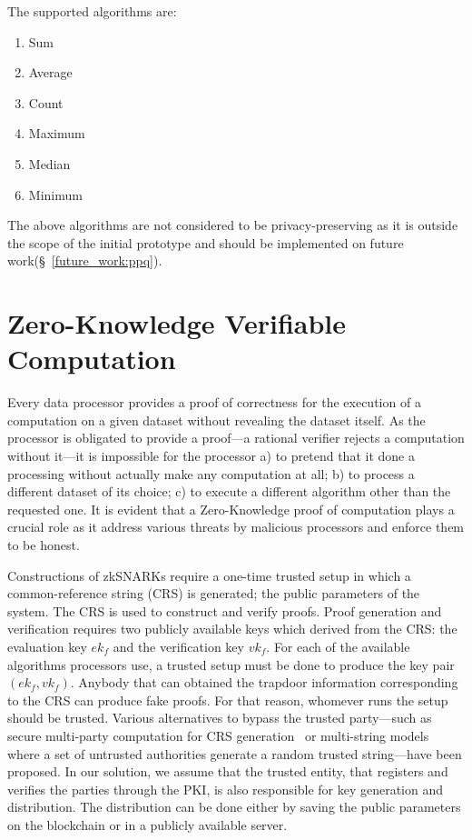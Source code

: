 The supported algorithms are:

\begin{enumerate}
  \item Sum
  \item Average
  \item Count
  \item Maximum
  \item Median
  \item Minimum
\end{enumerate}

The above algorithms are not considered to be privacy-preserving as it is outside the scope of the initial prototype and should be implemented on future work(§~\ref{future_work:ppq}).

\section{Zero-Knowledge Verifiable Computation}
\label{solution:proof}

Every data processor provides a proof of correctness for the execution of a computation on a given dataset without revealing the dataset itself. As the processor is obligated to provide a proof---a rational verifier rejects a computation without it---it is impossible for the processor a) to pretend that it done a processing without actually make any computation at all; b) to process a different dataset of its choice; c) to execute a different algorithm other than the requested one. It is evident that a Zero-Knowledge proof of computation plays a crucial role as it address various threats by malicious processors and enforce them to be honest.

Constructions of zkSNARKs require a one-time trusted setup in which a common-reference string (CRS) is generated; the public parameters of the system. The CRS is used to construct and verify proofs. Proof generation and verification requires two publicly available keys which derived from the CRS: the evaluation key $ek_f$ and the verification key $vk_f$. For each of the available algorithms processors use, a trusted setup must be done to produce the key pair $(ek_f, vk_f)$. Anybody that can obtained the trapdoor information corresponding to the CRS can produce fake proofs. For that reason, whomever runs the setup should be trusted. Various alternatives to bypass the trusted party---such as secure multi-party computation for CRS generation~\cite{zcash_mpc} or multi-string models~\cite{groth2014cryptography} where a set of untrusted authorities generate a random trusted string---have been proposed. In our solution, we assume that the trusted entity, that registers and verifies the parties through the PKI, is also responsible for key generation and distribution. The distribution can be done either by saving the public parameters on the blockchain or in a publicly available server.

